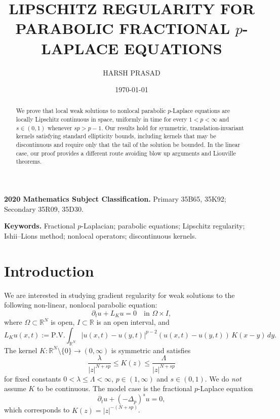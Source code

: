 \documentclass[11pt, a4paper, twoside]{article}
\theoremstyle{definition}
\theoremstyle{remark}
\newcommand{\R}{\mathbb{R}}
\begin{document}
\title{\textbf{\Large LIPSCHITZ REGULARITY FOR PARABOLIC FRACTIONAL $p$-LAPLACE EQUATIONS}}

\author[]{HARSH PRASAD}

\date{\today}
\maketitle
\pagestyle{fancy}
\fancyhf{}
\fancyfoot[C]{\thepage}
\renewcommand{\headrulewidth}{0pt}
\begin{abstract}
We prove that local weak solutions to nonlocal parabolic
$p$-Laplace equations are locally Lipschitz continuous in space,
uniformly in time for every $1<p<\infty$ and $s \in (0,1)$ whenever $sp > p-1$. Our results hold for
symmetric, translation-invariant kernels satisfying standard
ellipticity bounds, including kernels that may be discontinuous
and require only that the tail of the solution be bounded. In the linear case, our proof provides a different route avoiding blow up arguments and Liouville theorems. 
\end{abstract}

\medskip\noindent
\textbf{2020 Mathematics Subject Classification.}
Primary 35B65, 35K92; Secondary 35R09, 35D30.

\medskip\noindent
\textbf{Keywords.}
Fractional $p$-Laplacian; parabolic equations; Lipschitz
regularity; Ishii--Lions method; nonlocal operators;
discontinuous kernels.

\tableofcontents

\section{Introduction}
\label{sec:intro}
We are interested in studying gradient regularity for weak solutions to the following non-linear, nonlocal parabolic equation:
\begin{equation}\label{eq:main-eq}
  \partial_t u + L_K u = 0 \quad \text{in } \Omega \times I,
\end{equation}
where $\Omega \subset \R^N$ is open, $I \subset \R$ is an open
interval, and
\[
  L_K u(x,t) := \mathrm{P.V.} \int_{\R^N}
  |u(x,t)-u(y,t)|^{p-2}(u(x,t)-u(y,t))\, K(x-y)\, dy.
\]
The kernel $K : \R^N \setminus \{0\} \to (0,\infty)$ is
symmetric and satisfies
\begin{equation}\label{eq:kernel-bounds}
  \frac{\lambda}{|z|^{N+sp}} \le K(z)
  \le \frac{\Lambda}{|z|^{N+sp}}
\end{equation}
for fixed constants $0 < \lambda \le \Lambda < \infty$,
$p \in (1,\infty)$ and $s \in (0,1)$. We do \emph{not} assume
$K$ to be continuous. The model case is the fractional
$p$-Laplace equation
\[
  \partial_t u + (-\Delta_p)^s u = 0,
\]
which corresponds to $K(z) = |z|^{-(N+sp)}$. 
\end{document}
